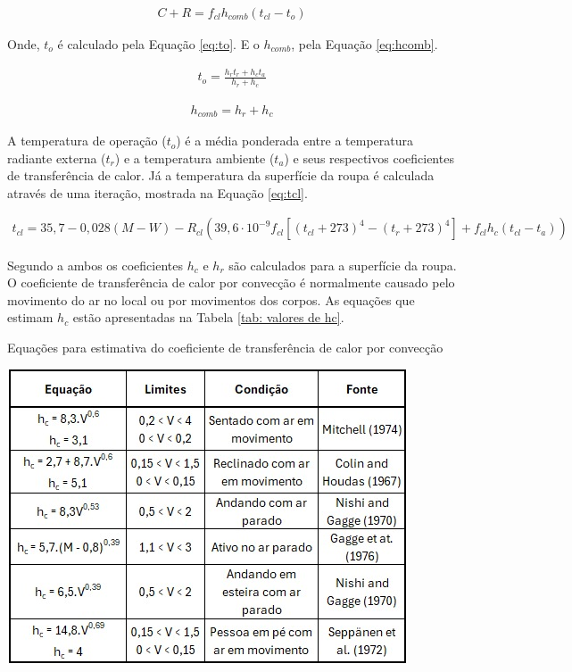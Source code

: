 \documentclass[acronym,symbols,table]{fei}
\begin{document}
\begin{equation} \label{eq:c+r}
    \begin{aligned}
    C+R = f_{cl} h_{comb} (t_{cl} - t_{o})
    \end{aligned}
\end{equation}

Onde, $t_{o}$ é calculado pela Equação \ref{eq:to}. E o $h_{comb}$, pela Equação \ref{eq:hcomb}.

\begin{equation} \label{eq:to}
    \begin{aligned}
   t_{o}= \frac{h_{r}t_{r}+h_{c}t_{a}}{h_{r}+h_{c}}
    \end{aligned}
\end{equation}

\begin{equation} \label{eq:hcomb}
    \begin{aligned}
   h_{comb}=h_{r}+h_{c}
    \end{aligned}
\end{equation}

A temperatura de operação ($t_{o}$) é a média ponderada entre a temperatura radiante externa ($t_{r}$) e a temperatura ambiente ($t_{a}$) e seus respectivos coeficientes de transferência de calor. Já a temperatura da superfície da roupa é calculada através de uma iteração, mostrada na Equação \ref{eq:tcl}.

\begin{equation} \label{eq:tcl}
    \begin{aligned}
   t_{cl}= 35,7-0,028(M-W) - R_{cl}(39,6\cdot10^{-9}f_{cl}[(t_{cl}+273)^4-(t_{r}+273)^4]+f_{cl}h_{c}(t_{cl}-t_{a}))
    \end{aligned}
\end{equation}

Segundo a \textcite{ASHRAE2009} ambos os coeficientes $h_{c}$ e $h_{r}$ são calculados para a superfície da roupa. O coeficiente de transferência de calor por convecção é normalmente causado pelo movimento do ar no local ou por movimentos dos corpos. As equações que estimam $h_{c}$ estão apresentadas na Tabela \ref{tab: valores de hc}. 

\begin{table}[!htb] 
 \centering
    \caption{Equações para estimativa do coeficiente de transferência de calor por convecção}
    \includegraphics[width=0.5\linewidth]{Tabelas/tabela-hc.jpeg}
    \label{tab: valores de hc}
\end{table}
\end{document}
